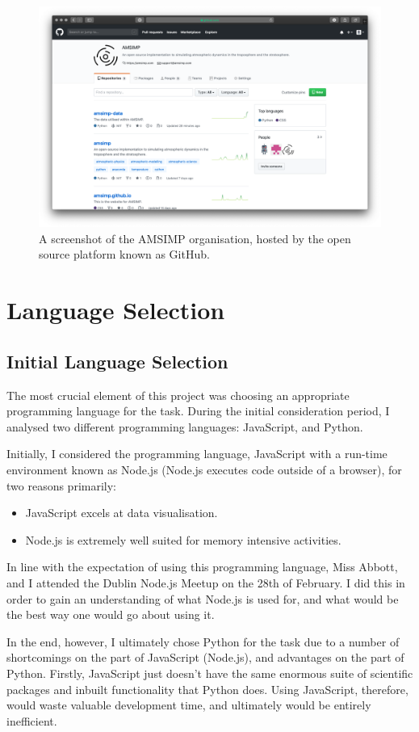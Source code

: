 \begin{figure}[H]
    \centering
    \includegraphics[width=.8\linewidth]{Images/github}
    \caption{A screenshot of the AMSIMP organisation, hosted by the open source platform known as GitHub.}
    \label{github}
\end{figure}

\section{Language Selection}
\subsection{Initial Language Selection}
The most crucial element of this project was choosing an appropriate programming language for the task. During the initial consideration period, I analysed two different programming languages: JavaScript, and Python\cite{python}. 

Initially, I considered the programming language, JavaScript with a run-time environment known as Node.js (Node.js executes code outside of a browser), for two reasons primarily:

\begin{itemize}
    \item JavaScript excels at data visualisation.
    \item Node.js is extremely well suited for memory intensive activities.
\end{itemize}

In line with the expectation of using this programming language, Miss Abbott, and I attended the Dublin Node.js Meetup on the 28th of February. I did this in order to gain an understanding of what Node.js is used for, and what would be the best way one would go about using it. 

In the end, however, I ultimately chose Python for the task due to a number of shortcomings on the part of JavaScript (Node.js), and advantages on the part of Python. Firstly, JavaScript just doesn’t have the same enormous suite of scientific packages and inbuilt functionality that Python does. Using JavaScript, therefore, would waste valuable development time, and ultimately would be entirely inefficient.

